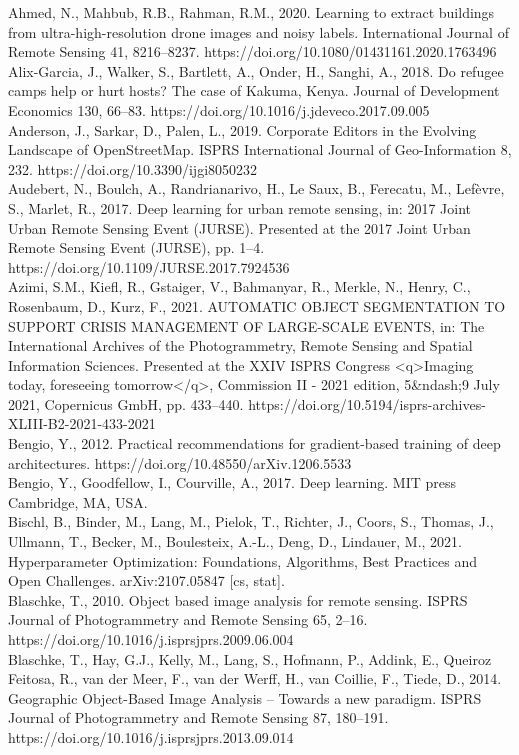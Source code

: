 \documentclass[11pt, a4paper, twoside]{report}
\begin{document}
Ahmed, N., Mahbub, R.B., Rahman, R.M., 2020. Learning to extract buildings from ultra-high-resolution drone images and noisy labels. International Journal of Remote Sensing 41, 8216–8237. https://doi.org/10.1080/01431161.2020.1763496\\
Alix-Garcia, J., Walker, S., Bartlett, A., Onder, H., Sanghi, A., 2018. Do refugee camps help or hurt hosts? The case of Kakuma, Kenya. Journal of Development Economics 130, 66–83. https://doi.org/10.1016/j.jdeveco.2017.09.005\\
Anderson, J., Sarkar, D., Palen, L., 2019. Corporate Editors in the Evolving Landscape of OpenStreetMap. ISPRS International Journal of Geo-Information 8, 232. https://doi.org/10.3390/ijgi8050232\\
Audebert, N., Boulch, A., Randrianarivo, H., Le Saux, B., Ferecatu, M., Lefèvre, S., Marlet, R., 2017. Deep learning for urban remote sensing, in: 2017 Joint Urban Remote Sensing Event (JURSE). Presented at the 2017 Joint Urban Remote Sensing Event (JURSE), pp. 1–4. https://doi.org/10.1109/JURSE.2017.7924536\\
Azimi, S.M., Kiefl, R., Gstaiger, V., Bahmanyar, R., Merkle, N., Henry, C., Rosenbaum, D., Kurz, F., 2021. AUTOMATIC OBJECT SEGMENTATION TO SUPPORT CRISIS MANAGEMENT OF LARGE-SCALE EVENTS, in: The International Archives of the Photogrammetry, Remote Sensing and Spatial Information Sciences. Presented at the XXIV ISPRS Congress <q>Imaging today, foreseeing tomorrow</q>, Commission II - 2021 edition, 5&ndash;9 July 2021, Copernicus GmbH, pp. 433–440. https://doi.org/10.5194/isprs-archives-XLIII-B2-2021-433-2021\\
Bengio, Y., 2012. Practical recommendations for gradient-based training of deep architectures. https://doi.org/10.48550/arXiv.1206.5533\\
Bengio, Y., Goodfellow, I., Courville, A., 2017. Deep learning. MIT press Cambridge, MA, USA.\\
Bischl, B., Binder, M., Lang, M., Pielok, T., Richter, J., Coors, S., Thomas, J., Ullmann, T., Becker, M., Boulesteix, A.-L., Deng, D., Lindauer, M., 2021. Hyperparameter Optimization: Foundations, Algorithms, Best Practices and Open Challenges. arXiv:2107.05847 [cs, stat].\\
Blaschke, T., 2010. Object based image analysis for remote sensing. ISPRS Journal of Photogrammetry and Remote Sensing 65, 2–16. https://doi.org/10.1016/j.isprsjprs.2009.06.004\\
Blaschke, T., Hay, G.J., Kelly, M., Lang, S., Hofmann, P., Addink, E., Queiroz Feitosa, R., van der Meer, F., van der Werff, H., van Coillie, F., Tiede, D., 2014. Geographic Object-Based Image Analysis – Towards a new paradigm. ISPRS Journal of Photogrammetry and Remote Sensing 87, 180–191. https://doi.org/10.1016/j.isprsjprs.2013.09.014\\
\end{document}
